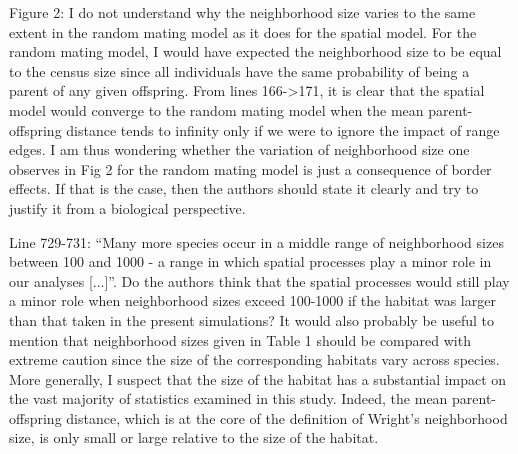 
\begin{point}{}
    Figure 2: I do not understand why the neighborhood size varies to the same extent in the random mating model as it does for the spatial model. For the random mating model, I would have expected the neighborhood size to be equal to the census size since all individuals have the same probability of being a parent of any given offspring. From lines 166->171, it is clear that the spatial model would converge to the random mating model when the mean parent-offspring distance tends to infinity only if we were to ignore the impact of range edges. I am thus wondering whether the variation of neighborhood size one observes in Fig 2 for the random mating model is just a consequence of border effects. If that is the case, then the authors should state it clearly and try to justify it from a biological perspective.
\end{point}


\begin{point}{}
    Line 729-731: ``Many more species occur in a middle range of neighborhood sizes between 100 and 1000 - a range in which spatial processes play a minor role in our analyses [...]''. Do the authors think that the spatial processes would still play a minor role when neighborhood sizes exceed 100-1000 if the habitat was larger than that taken in the present simulations? It would also probably be useful to mention that neighborhood sizes given in Table 1 should be compared with extreme caution since the size of the corresponding habitats vary across species. More generally, I suspect that the size of the habitat has a substantial impact on the vast majority of statistics examined in this study. Indeed, the mean parent-offspring distance, which is at the core of the definition of Wright's neighborhood size, is only small or large relative to the size of the habitat.
\end{point}

